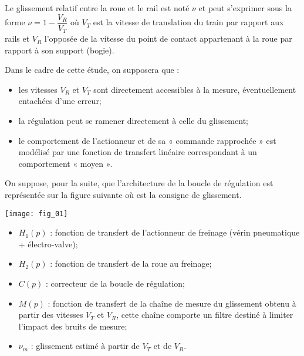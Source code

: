 Le glissement relatif entre la roue et le rail est noté $\nu$ et peut s'exprimer sous la forme $\nu=1-\dfrac{V_R}{V_T}$ où $V_T$ est la vitesse de translation du train par rapport aux rails et $V_R$ l'opposée de la vitesse du point de contact appartenant à la roue par rapport à son support (bogie).
%

Dans le cadre de cette étude, on supposera que :
\begin{itemize}
\item les vitesses $V_R$ et $V_T$ sont directement accessibles à la mesure, éventuellement
entachées d’une erreur;
\item la régulation peut se ramener directement à celle du glissement;
\item  le comportement de l’actionneur et de sa « commande rapprochée » est modélisé
par une fonction de transfert linéaire correspondant à un comportement
« moyen ».
\end{itemize}
On suppose, pour la suite, que l’architecture de la boucle de régulation est représentée sur la figure suivante où est la consigne de glissement.

\begin{marginfigure}
\texttt{[image: fig\_01]}
\end{marginfigure}


\begin{itemize}
\item $H_1(p)$ : fonction de transfert de l’actionneur de freinage (vérin pneumatique
+ électro-valve);
\item $H_2(p)$ : fonction de transfert de la roue au freinage;
\item $C(p)$ : correcteur de la boucle de régulation;
\item $M(p)$ : fonction de transfert de la chaîne de mesure du glissement obtenu à
partir des vitesses $V_T$ et $V_R$, cette chaîne comporte un filtre destiné à limiter
l’impact des bruits de mesure;
\item $\nu_m$ : glissement estimé à partir de $V_T$ et de $V_R$.
\end{itemize}

